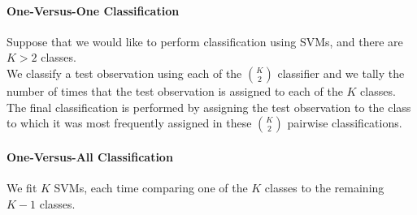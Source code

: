 \paragraph{One-Versus-One Classification}
Suppose that we would like to perform classification using SVMs, and
there are $K>2$ classes.\\
We classify a test observation using each of the $\binom{K}{2}$ 
classifier and we tally the number of times that the test observation
is assigned to each of the $K$ classes. The final classification is 
performed by assigning the test observation to the class to which it
was most frequently assigned in these $\binom{K}{2}$ pairwise
classifications.

\paragraph{One-Versus-All Classification}
We fit $K$ SVMs, each time comparing one of the $K$ classes to the 
remaining $K-1$ classes.
